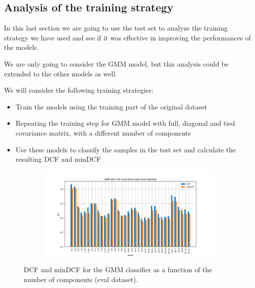 \documentclass[12pt]{report}
\newcommand{\nnl}{%
    \newline
    \newline
}
\newcommand{\nl}{%
    \newline
    \noindent
}
\begin{document}
\subsection*{Analysis of the training strategy}
In this last section we are going to use the test set to analyze the training strategy we have used and see if it was effective in improving the performances of the models.
\nl
We are only going to consider the GMM model, but this analysis could be extended to the other models as well.
\nnl
We will consider the following training strategies:
\begin{itemize}
    \item Train the models using the training part of the original dataset
    \item Repeating the training step for GMM model with full, diagonal and tied covariance matrix, with a different number of components
    \item Use these models to classify the samples in the test set and calculate the resulting DCF and minDCF
\end{itemize}

\begin{figure}[H]
    \centering
    \begin{subfigure}[t]{0.6\textwidth}
        \includegraphics[width=\textwidth]{./plot/eval/GMM/gmm_full.png}
    \end{subfigure}
    \caption{DCF and minDCF for the GMM classifier as a function of the number of components (eval dataset).}
    \label{fig:gmm_full_eval}
\end{figure}
\end{document}
